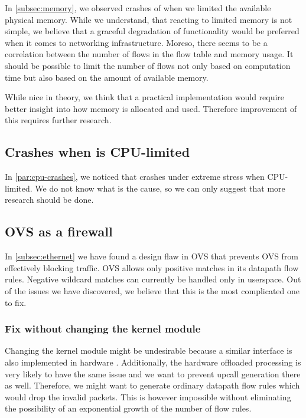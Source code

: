 In \cref{subsec:memory}, we observed crashes of  when we limited the available physical memory. While we understand, that reacting to limited memory is not simple, we believe that a graceful degradation of functionality would be preferred when it comes to networking infrastructure. Moreso, there seems to be a correlation between the number of flows in the flow table and memory usage. It should be possible to limit the number of flows not only based on computation time but also based on the amount of available memory.

While nice in theory, we think that a practical implementation would require better insight into how memory is allocated and used. Therefore improvement of this requires further research.


\subsection{Crashes when  is CPU-limited}

In \cref{par:cpu-crashes}, we noticed that  crashes under extreme stress when CPU-limited. We do not know what is the cause, so we can only suggest that more research should be done.

\subsection{OVS as a firewall}

In \cref{subsec:ethernet} we have found a design flaw in OVS that prevents OVS from effectively blocking traffic. OVS allows only positive matches in its datapath flow rules. Negative wildcard matches can currently be handled only in userspace. Out of the issues we have discovered, we believe that this is the most complicated one to fix. 

\subsubsection{Fix without changing the kernel module}
Changing the kernel module might be undesirable because a similar interface is also implemented in hardware \cite{OVSHW}. Additionally, the hardware offloaded processing is very likely to have the same issue and we want to prevent upcall generation there as well. Therefore, we might want to generate ordinary datapath flow rules which would drop the invalid packets. This is however impossible without eliminating the possibility of an exponential growth of the number of flow rules.

